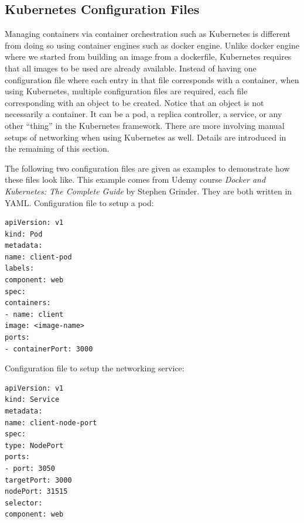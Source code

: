 \subsection{Kubernetes Configuration Files}

Managing containers via container orchestration such as Kubernetes is different from doing so using container engines such as docker engine. Unlike docker engine where we started from building an image from a dockerfile, Kubernetes requires that all images to be used are already available. Instead of having one configuration file where each entry in that file corresponds with a container, when using Kubernetes, multiple configuration files are required, each file corresponding with an object to be created. Notice that an object is not necessarily a container. It can be a pod, a replica controller, a service, or any other ``thing'' in the Kubernetes framework. There are more involving manual setups of networking when using Kubernetes as well. Details are introduced in the remaining of this section.

The following two configuration files are given as examples \cite{stephen2023docker} to demonstrate how these files look like. This example comes from Udemy course \textit{Docker and Kubernetes: The Complete Guide} by Stephen Grinder. They are both written in YAML. Configuration file to setup a pod:
\begin{lstlisting}
apiVersion: v1
kind: Pod
metadata:
name: client-pod
labels:
component: web
spec:
containers:
- name: client
image: <image-name>
ports:
- containerPort: 3000
\end{lstlisting}
Configuration file to setup the networking service:
\begin{lstlisting}
apiVersion: v1
kind: Service
metadata:
name: client-node-port
spec:
type: NodePort
ports:
- port: 3050
targetPort: 3000
nodePort: 31515
selector:
component: web
\end{lstlisting}

